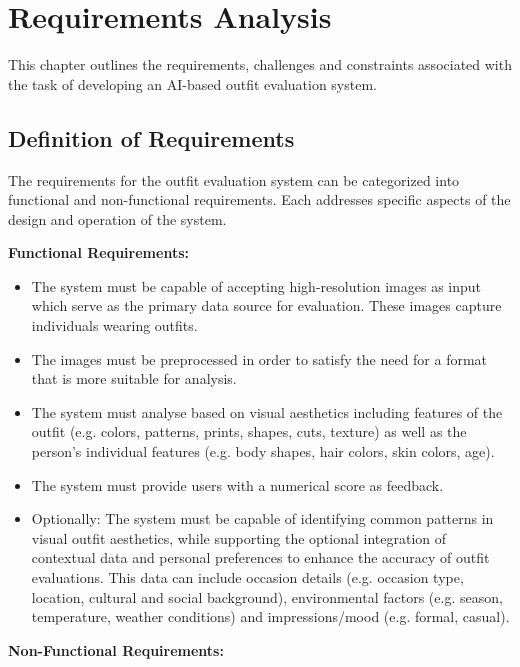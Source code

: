 \chapter{Requirements Analysis}

This chapter outlines the requirements, challenges and constraints associated with the task of developing an \acs{AI}-based outfit evaluation system.

\section{Definition of Requirements}

The requirements for the outfit evaluation system can be categorized into functional and non-functional requirements. Each addresses specific aspects of the design and operation of the system.

\vspace{0.5cm}

\textbf{Functional Requirements:}

\begin{itemize}
  \item The system must be capable of accepting high-resolution images as input which serve as the primary data source for evaluation. These images capture individuals wearing outfits.
  \item The images must be preprocessed in order to satisfy the need for a format that is more suitable for analysis.
  \item The system must analyse based on visual aesthetics including features of the outfit (e.g. colors, patterns, prints, shapes, cuts, texture) as well as the person's individual features (e.g. body shapes, hair colors, skin colors, age).
  \item The system must provide users with a numerical score as feedback.
  \item Optionally: The system must be capable of identifying common patterns in visual outfit aesthetics, while supporting the optional integration of contextual data and personal preferences to enhance the accuracy of outfit evaluations. This data can include occasion details (e.g. occasion type, location, cultural and social background), environmental factors (e.g. season, temperature, weather conditions) and impressions/mood (e.g. formal, casual).
\end{itemize}

\vspace{0.5cm}

\textbf{Non-Functional Requirements:}


